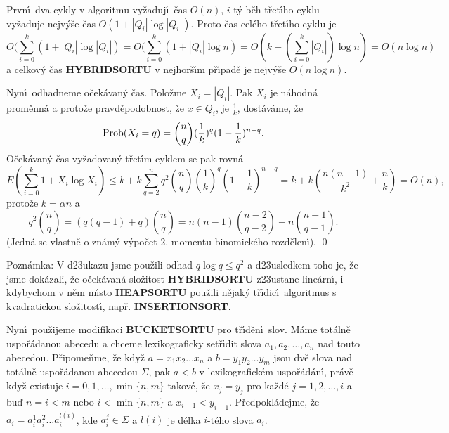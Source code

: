 Prvn\'\i\ dva cykly v algoritmu 
vy\v zaduj\'\i\ \v cas $O(n)$, $i$-t\'y b\v eh t\v ret\'\i ho cyklu vy\v zaduje 
nejv\'y\v se \v cas $O(1+|Q_i|\log|Q_i|)$. Proto \v cas cel\'eho t\v ret\'\i ho cyklu je 
$$O(\sum_{i=0}^k(1+|Q_i|\log|Q_i|)=O(\sum_{i=0}^k(1+|Q_i|\log n)=
O(k+(\sum_{i=0}^k|Q_i|)\log n)=O(n\log n)$$
a celkov\'y \v cas {\bf HYBRIDSORTU} v nejhor\v s\'\i m p\v r\'\i pad\v e je nejv\'y\v se $
O(n\log n)$.
\medskip

\flushpar Nyn\'\i\ odhadneme o\v cek\'avan\'y \v cas. Polo\v zme 
$X_i=|Q_i|$. Pak 
$X_i$ je n\'a\-hodn\'a prom\v enn\'a a 
proto\v ze pravd\v epodobnost, \v ze $x\in Q_i$, je $\frac 1k$, dost\'a\-v\'ame, \v ze 
$$\operatorname{Prob}(X_i=q)=\binom nq(\frac 1k)^q(1-\frac 1k)^{n-q}.$$
O\v cek\'avan\'y \v cas vy\v zadovan\'y t\v ret\'\i m cyklem se pak rovn\'a 
$$E(\sum_{i=0}^k1+X_i\log X_i)\le k+k\sum_{q=2}^nq^2\binom nq(\frac 
1k)^q(1-\frac 1k)^{n-q}=k+k(\frac {n(n-1)}{k^2}+\frac nk)=O(n),$$
proto\v ze $k=\alpha n$ a 
$$q^2\binom nq=(q(q-1)+q)\binom nq=n(n-1)\binom {n-2}{q-2}+n\binom {
n-1}{q-1}.$$
(Jedn\'a se vlastn\v e o zn\'am\'y v\'ypo\v cet 2. momentu 
binomick\'eho rozd\v elen\'\i ). \qed
\enddemo
\medskip

\flushpar Pozn\'amka: V d\accent23ukazu jsme pou\v zili odhad 
$q\log q\le q^2$ a d\accent23usledkem toho je, \v ze jsme 
dok\'azali, \v ze o\v cek\'avan\'a slo\v zitost {\bf HYBRIDSORTU }
z\accent23ustane line\'arn\'\i , i kdybychom v n\v em m\'\i sto 
{\bf HEAPSORTU} pou\v zili n\v ejak\'y t\v r\'\i dic\'\i\ algoritmus s 
kvadratickou slo\v zitost\'\i , nap\v r. {\bf INSERTIONSORT}.
\medskip

\flushpar Nyn\'\i\ pou\v zijeme modifikaci {\bf BUCKETSORTU} pro 
t\v r\'\i d\v en\'\i\ slov.  M\'ame tot\'aln\v e 
uspo\v r\'adanou abecedu a chceme lexikograficky set\v r\'\i dit slova 
$a_1,a_2,\dots,a_n$ nad touto abecedou. P\v ripo\-me\v n\-me, \v ze kdy\v z 
$a=x_1x_2\dots x_n$ a $b=y_1y_2\dots y_m$ jsou dv\v e slova nad tot\'aln\v e 
uspo\v r\'a\-danou abecedou $\Sigma$, pak $a<b$ v lexikografick\'em 
uspo\v r\'ad\'an\'\i , pr\'av\v e kdy\v z existuje $i=0,1,\dots,\min
\{n,m\}$ takov\'e, \v ze 
$x_j=y_j$  pro ka\v zd\'e $j=1,2,\dots,i$ a bu\v d $n=i<m$ nebo $
i<\min\{n,m\}$ 
a $x_{i+1}<y_{i+1}$. P\v redpokl\'adejme, \v ze $a_i=a_i^1a_i^2\dots 
a_i^{l(i)}$, kde 
$a_i^j\in\Sigma$ a $l(i)$ je d\'elka $i$-t\'eho slova $a_i$.
\bigskip

